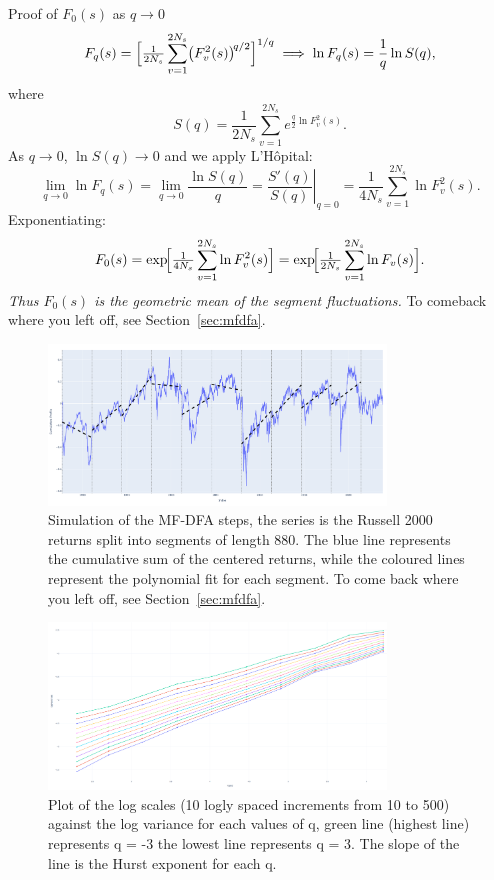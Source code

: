 \documentclass[11pt]{extarticle}
\begin{document}
\label{sec:proof_F0}
\begin{frame}{Proof of \(F_0(s)\) as \(q\to0\)}
  \[
    F_q(s)
    =\Bigl[\tfrac{1}{2N_s}\sum_{v=1}^{2N_s}\bigl(F_v^2(s)\bigr)^{\!q/2}\Bigr]^{1/q}
    \;\Longrightarrow\;
    \ln F_q(s)
    =\frac{1}{q}\ln S(q),
  \]
  where
  \[
    S(q)=\frac{1}{2N_s}\sum_{v=1}^{2N_s}e^{\tfrac{q}{2}\ln F_v^2(s)}.
  \]
  As \(q\to0\), \(\ln S(q)\to0\) and we apply L’Hôpital:
  \[
    \lim_{q\to0}\ln F_q(s)
    =\lim_{q\to0}\frac{\ln S(q)}{q}
    =\left.\frac{S'(q)}{S(q)}\right|_{q=0}
    =\frac{1}{4N_s}\sum_{v=1}^{2N_s}\ln F_v^2(s).
  \]
  Exponentiating:
  \[
    F_0(s)
    =\exp\!\Bigl[\tfrac{1}{4N_s}\sum_{v=1}^{2N_s}\ln F_v^2(s)\Bigr]
    =\exp\!\Bigl[\tfrac{1}{2N_s}\sum_{v=1}^{2N_s}\ln F_v(s)\Bigr].
  \]
  \vspace{4pt}
  \textit{Thus \(F_0(s)\) is the geometric mean of the segment fluctuations.}
    To comeback where you left off, see Section~\ref{sec:mfdfa}.
\end{frame}

\begin{figure}[ht]
    \centering
    \includegraphics[width=0.8\textwidth]{img/cumulative_profile_segment_partitioning}
    \caption{Simulation of the MF-DFA steps, the series is the Russell 2000 returns
    split into segments of length 880.
        The blue line represents the cumulative sum of the centered returns, while the coloured lines represent the polynomial fit for
    each segment. To come back where you left off, see Section~\ref{sec:mfdfa}.}
    \label{fig:cumulative_profile_segment_partitioning}
\end{figure}
\FloatBarrier




\begin{figure}[ht]
    \centering
    \includegraphics[width=0.8\textwidth]{img/log_variance_log_scale}
    \caption{Plot of the log scales (10 logly spaced increments from 10 to 500) against the log variance for each values of q, green line (highest line) represents q = -3
    the lowest line represents q = 3. The slope of the line is the Hurst exponent for each q.}
    \label{fig:log_variance_log_scale}
\end{figure}
\FloatBarrier
\end{document}
